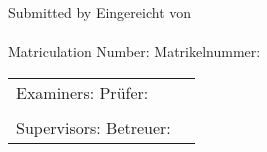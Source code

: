 \begin{titlepage}

    \newcommand{\titlesubmittedby}{\ifenglish Submitted by \else Eingereicht von \fi}
    \newcommand{\titlematriculationnumber}{\ifenglish Matriculation Number: \else Matrikelnummer: \fi}
    \newcommand{\titleexaminers}{\ifenglish Examiners: \else Prüfer: \fi}
    \newcommand{\titlesupervisors}{\ifenglish Supervisors: \else Betreuer: \fi}
    \newcommand{\titleheaderpath}{\ifenglish images/unistuttgart_logo_lehrstuhl_english.eps
                                  \else images/unistuttgart_logo_lehrstuhl_deutsch.eps \fi}
		\newcommand{\titleinstitute}{\ifenglish Institute for Modeling Hydraulic and Environmental Systems \else Institut für Wasser- und Umweltsystemmodellierung \fi}
		\newcommand{\titlechair}{\ifenglish Department of Stochastic Simulation and Safety Research for Hydrosystems \else Lehrstuhl für Stochastische Simulation und Sicherheitsforschung für Hydrosysteme \fi}

    \begingroup
    \ifxetexorluatex
    \else
        \selectfont
    \fi

    \centering
    \vspace*{5cm}
    {\large \titlethesistype{}} \\
    \bigbreak
    \bigbreak
    {
        \huge \bfseries \titletitle{} \\
        \medskip
    }

    \vfill

    \titlesubmittedby{}\\
    \bigskip
    {\large \titleauthor{}} \\
    \bigskip
    \titlematriculationnumber{} \titleauthormatriculationnumber{} \\
    \vfill


    \begin{tabular}{ll}
        \titleexaminers{} & \titleexaminernames{} \\
	& \\
        \titlesupervisors{} & \titlesupervisornames{} \\
    \end{tabular}


\end{titlepage}

